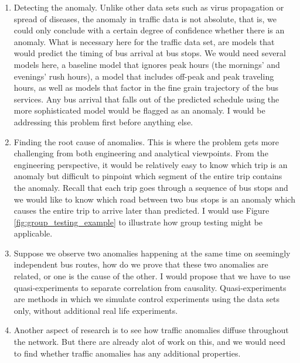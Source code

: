 \documentclass{sig-alternate}
\begin{document}
\begin{enumerate}
	\item Detecting the anomaly. Unlike other data sets such as virus propagation or spread of diseases, the anomaly in traffic data is not absolute, that is, we could only conclude with a certain degree of confidence whether there is an anomaly. What is necessary here for the traffic data set, are models that would predict the timing of bus arrival at bus stops. We would need several models here, a baseline model that ignores peak hours (the mornings' and evenings' rush hours), a model that includes off-peak and peak traveling hours, as well as models that factor in the fine grain trajectory of the bus services. Any bus arrival that falls out of the predicted schedule using the more sophisticated model would be flagged as an anomaly. I would be addressing this problem first before anything else.

	\item Finding the root cause of anomalies. This is where the problem gets more challenging from both engineering and analytical viewpoints. From the engineering perspective, it would be relatively easy to know which trip is an anomaly but difficult to pinpoint which segment of the entire trip contains the anomaly. Recall that each trip goes through a sequence of bus stops and we would like to know which road between two bus stops is an anomaly which causes the entire trip to arrive later than predicted. I would use Figure \ref{fig:group_testing_example} to illustrate how group testing might be applicable. %

	\item Suppose we observe two anomalies happening at the same time on seemingly independent bus routes, how do we prove that these two anomalies are related, or one is the cause of the other. I would propose that we have to use quasi-experiments to separate correlation from causality. Quasi-experiments are methods in which we simulate control experiments using the data sets only, without additional real life experiments. 


	\item Another aspect of research is to see how traffic anomalies diffuse throughout the network. But there are already alot of work on this, and we would need to find whether traffic anomalies has any additional properties.
\end{enumerate}
\end{document}
